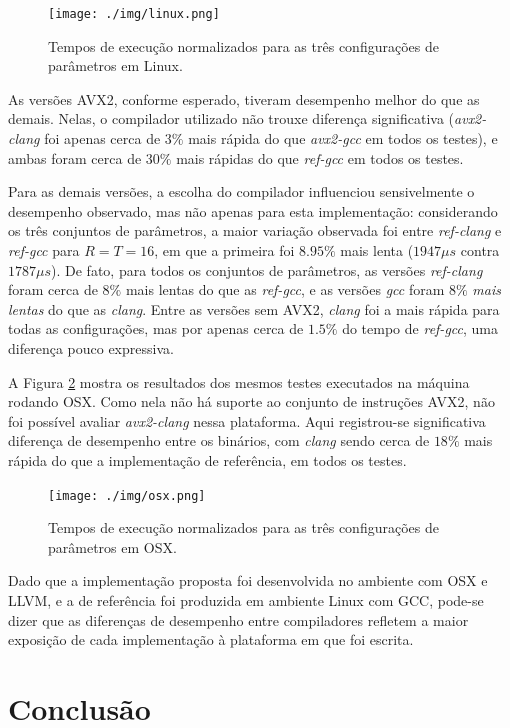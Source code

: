 \documentclass{article}
\begin{document}
\begin{figure}[htbp]
\centering
\texttt{[image: ./img/linux.png]}
\caption{Tempos de execução normalizados para as três configurações de parâmetros em Linux\label{results-linux}.}
\end{figure}

As versões AVX2, conforme esperado, tiveram desempenho melhor do que as
demais. Nelas, o compilador utilizado não trouxe diferença significativa
(\emph{avx2-clang} foi apenas cerca de $3\%$ mais rápida do que
\emph{avx2-gcc} em todos os testes), e ambas foram cerca de $30\%$
mais rápidas do que \emph{ref-gcc} em todos os testes.

Para as demais versões, a escolha do compilador influenciou sensivelmente o
desempenho observado, mas não apenas para esta implementação:
considerando os três conjuntos de parâmetros, a maior variação observada
foi entre \emph{ref-clang} e \emph{ref-gcc} para $R = T = 16$, em que
a primeira foi $8.95\%$ mais lenta ($1947 \mu s$ contra
$1787 \mu s$). De fato, para todos os conjuntos de parâmetros, as
versões \emph{ref-clang} foram cerca de $8\%$ mais lentas do que as
\emph{ref-gcc}, e as versões \emph{gcc} foram $8\%$ \emph{mais lentas}
do que as \emph{clang}. Entre as versões sem AVX2, \emph{clang} foi a
mais rápida para todas as configurações, mas por apenas cerca de
$1.5\%$ do tempo de \emph{ref-gcc}, uma diferença pouco expressiva.

A Figura \ref{results-osx} mostra os resultados dos mesmos testes
executados na máquina rodando OSX. Como nela não há suporte ao conjunto
de instruções AVX2, não foi possível avaliar \emph{avx2-clang} nessa
plataforma. Aqui registrou-se significativa diferença de desempenho entre os
binários, com \emph{clang} sendo cerca de $18\%$ mais rápida do que a
implementação de referência, em todos os testes.

\begin{figure}[htbp]
\centering
\texttt{[image: ./img/osx.png]}
\caption{Tempos de execução normalizados para as três configurações de
parâmetros em OSX\label{results-osx}.}
\end{figure}

Dado que a implementação proposta foi desenvolvida no ambiente com OSX e
LLVM, e a de referência foi produzida em ambiente Linux com GCC,
pode-se dizer que as diferenças de desempenho entre compiladores
refletem a maior exposição de cada implementação à plataforma em que foi
escrita.

\section{Conclusão}
\end{document}
